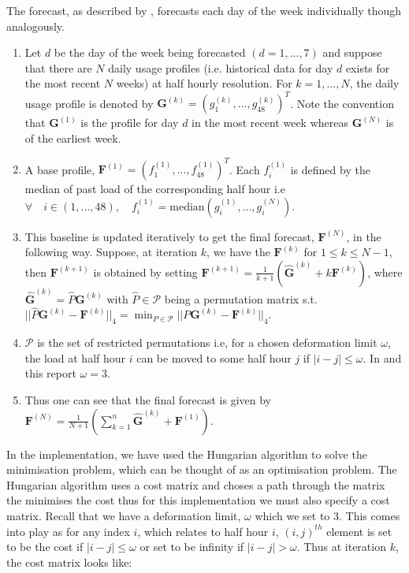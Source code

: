 \documentclass[a4paper]{article}
\begin{document}
The forecast, as described by \cite{dan14}, forecasts each day of the week individually though analogously.
\begin{enumerate}[label=\roman*)]
\item Let $d$ be the day of the week being forecasted $(d=1,...,7)$ and suppose that there are $N$ daily usage profiles (i.e. historical data for day $d$ exists for the most recent $N$ weeks) at half hourly resolution. For $k = 1, ..., N$, the daily usage profile is denoted by $\boldsymbol{G}^{(k)} = (g_1^{(k)}, ... , g_{48}^{(k)})^T$. Note the convention that $\boldsymbol{G}^{(1)}$ is the profile for day $d$ in the most recent week whereas $\boldsymbol{G}^{(N)}$ is of the earliest week.
\item A base profile, $\boldsymbol{F}^{(1)} = \left(f_1^{(1)}, ... , f_{48}^{(1)} \right)^T$. Each $f_i^{(1)}$ is defined by the median of past load of the corresponding half hour i.e $ \forall \quad i \in (1, ..., 48), \quad f_i^{(1)} = \text{median}(g_i^{(1)}, ..., g_i^{(N)})$.
\item This baseline is updated iteratively to get the final forecast, $\boldsymbol{F}^{(N)}$, in the following way. Suppose, at iteration $k$, we have the $\boldsymbol{F}^{(k)}$ for $1 \le k \le N-1$, then $\boldsymbol{F}^{(k+1)}$ is obtained by setting $\boldsymbol{F}^{(k+1)} = \frac{1}{k+1} \left( \boldsymbol{\hat{G}}^{(k)} + k \boldsymbol{F}^{(k)}\right)$, where $\boldsymbol{\hat{G}}^{(k)} = \hat{P}\boldsymbol{G}^{(k)}$ with $\hat{P} \in  \mathscr{P}$ being a permutation matrix s.t. $||\hat{P}\boldsymbol{G}^{(k)} - \boldsymbol{F}^{(k)}||_4 = \displaystyle \min_{P \in \mathscr{P}}||P\boldsymbol{G}^{(k)} - \boldsymbol{F}^{(k)}||_4 $.
\item $\mathscr{P}$ is the set of restricted permutations i.e, for a chosen deformation limit $\omega$, the load at half hour $i$ can be moved to some half hour $j$ if $|i-j| \le \omega$. In \cite{dan14} and this report $\omega=3$.
\item Thus one can see that the final forecast is given by $\boldsymbol{F}^{(N)} = \frac{1}{N+1}\left(\displaystyle \sum_{k=1}^n \boldsymbol{\hat{G}}^{(k)} + \boldsymbol{F}^{(1)} \right)$.
\end{enumerate}

In the implementation, we have used the Hungarian algorithm to solve the minimisation problem, which can be thought of as an optimisation problem. The Hungarian algorithm uses a cost matrix and choses a path through the matrix the minimises the cost thus for this implementation we must also specify a cost matrix. Recall that we have a deformation limit, $\omega$ which we set to 3. This comes into play as for any index $i$, which relates to half hour $i$, $(i,j)^{th}$ element is set to be the cost if $|i-j|\le\omega$ or set to be infinity if $|i-j| > \omega$. Thus at iteration $k$, the cost matrix looks like:
\end{document}
